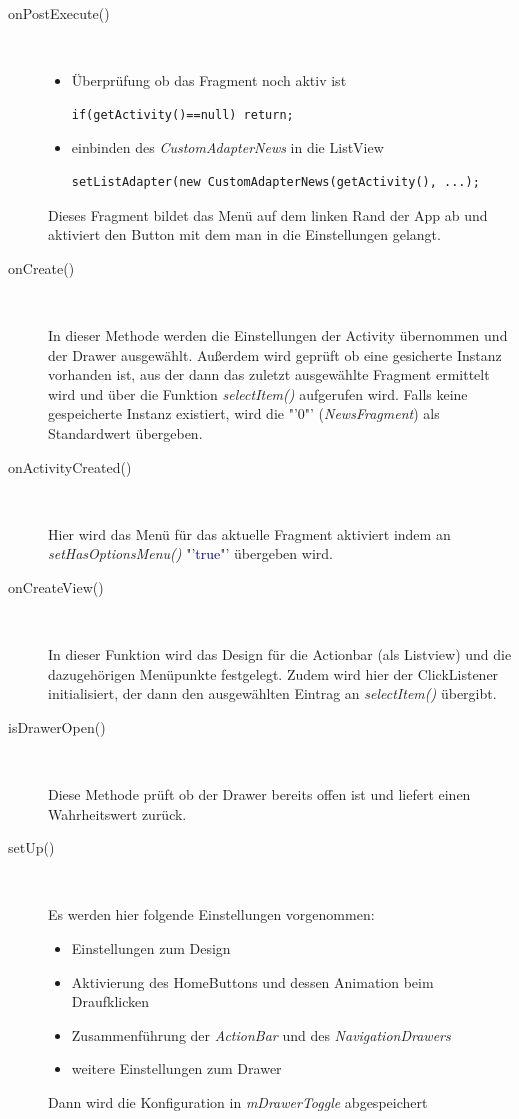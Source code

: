 \begin{description}
\item[onPostExecute()]~\par
\begin{itemize}
\item  Überprüfung ob das Fragment noch aktiv ist
\begin{lstlisting}
if(getActivity()==null) return;
\end{lstlisting}
\item einbinden des \textit{CustomAdapterNews} in die ListView
\begin{lstlisting}
setListAdapter(new CustomAdapterNews(getActivity(), ...);
\end{lstlisting}
\end{itemize}

Dieses Fragment bildet das Menü auf dem linken Rand der App ab und aktiviert den Button mit dem man in die Einstellungen gelangt.

\item[onCreate()]~\par
In dieser Methode werden die Einstellungen der Activity übernommen und der Drawer ausgewählt. Außerdem wird geprüft ob eine gesicherte Instanz vorhanden ist, aus der dann das zuletzt ausgewählte Fragment ermittelt wird und über die Funktion \textit{selectItem()} aufgerufen wird. Falls keine gespeicherte Instanz existiert, wird die "'0"' (\textit{NewsFragment}) als Standardwert übergeben.
 
\item[onActivityCreated()]~\par
Hier wird das Menü für das aktuelle Fragment aktiviert indem an \textit{setHasOptionsMenu()} "'\textcolor{darkblue}{true}"' übergeben wird.
 
\item[onCreateView()]~\par
In dieser Funktion wird das Design für die Actionbar (als Listview) und die dazugehörigen Menüpunkte festgelegt. Zudem wird hier der ClickListener initialisiert, der dann den ausgewählten Eintrag an \textit{selectItem()} übergibt.

\item[isDrawerOpen()]~\par
Diese Methode prüft ob der Drawer bereits offen ist und liefert einen Wahrheitswert zurück.
 
\item[setUp()]~\par
Es werden hier folgende Einstellungen vorgenommen:
\begin{itemize}
\item Einstellungen zum Design
\item Aktivierung des HomeButtons und dessen Animation beim Draufklicken
\item Zusammenführung der \textit{ActionBar} und des \textit{NavigationDrawers}
\item weitere Einstellungen zum Drawer
\end{itemize}
Dann wird die Konfiguration in \textit{mDrawerToggle} abgespeichert


\end{description}
